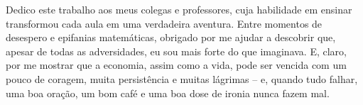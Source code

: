 \begin{dedicatoria}
   \vspace*{\fill}

{%
	\noindent\hspace{.5\textwidth}
	{\begin{minipage}{.5\textwidth}
			\begin{flushleft}
				Dedico este trabalho aos meus colegas e professores, cuja habilidade em ensinar transformou cada aula em uma verdadeira aventura. Entre momentos de desespero e epifanias matemáticas, obrigado por me ajudar a descobrir que, apesar de todas as adversidades, eu sou mais forte do que imaginava. E, claro, por me mostrar que a economia, assim como a vida, pode ser vencida com um pouco de coragem, muita persistência e muitas lágrimas – e, quando tudo falhar, uma boa oração, um bom café e uma boa dose de ironia nunca fazem mal.
			\end{flushleft}
	\end{minipage}}%
\vspace*{3cm}
}%

\end{dedicatoria}
